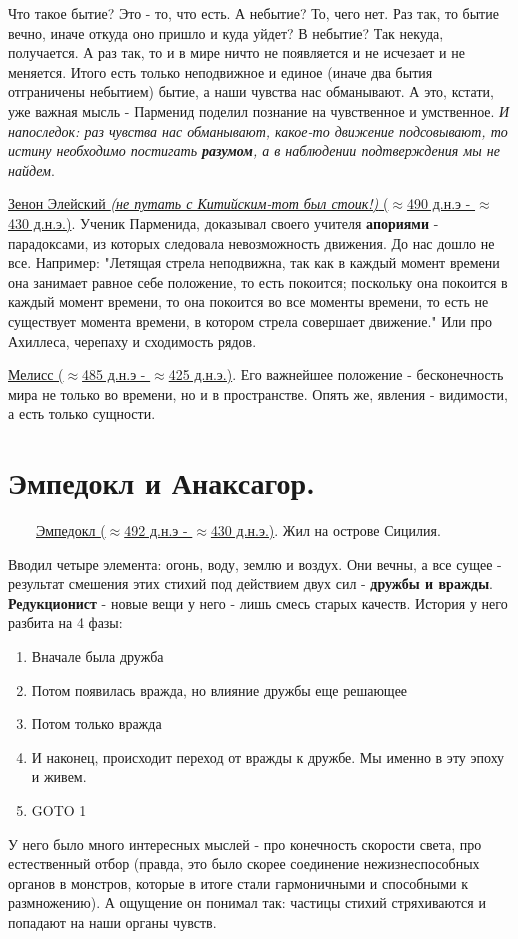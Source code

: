Что такое бытие? Это - то, что есть. А небытие? То, чего нет. Раз так, то бытие вечно, иначе откуда оно пришло и куда уйдет? В небытие? Так некуда, получается. А раз так, то и в мире ничто не появляется и не исчезает и не меняется. Итого есть только неподвижное и единое (иначе два бытия отграничены небытием) бытие, а наши чувства нас обманывают. А это, кстати, уже важная мысль - Парменид поделил познание на чувственное и умственное. \textit{И напоследок: раз чувства нас обманывают, какое-то движение подсовывают, то истину необходимо постигать \textbf{разумом}, а в наблюдении подтверждения мы не найдем}.

\underline{Зенон Элейский \textit{(не путать с Китийским-тот был стоик!)} ($\approx$490 д.н.э - $\approx$430 д.н.э.)}. Ученик Парменида, доказывал своего учителя \textbf{апориями} - парадоксами, из которых следовала невозможность движения. До нас дошло не все. Например: "Летящая стрела неподвижна, так как в каждый момент времени она занимает равное себе положение, то есть покоится; поскольку она покоится в каждый момент времени, то она покоится во все моменты времени, то есть не существует момента времени, в котором стрела совершает движение." Или про Ахиллеса, черепаху и сходимость рядов.

\underline{Мелисс ($\approx$485 д.н.э - $\approx$425 д.н.э.)}. Его важнейшее положение - бесконечность мира не только во времени, но и в пространстве. Опять же, явления - видимости, а есть только сущности.



\section{Эмпедокл и Анаксагор.}
\ \ \ \
\underline{Эмпедокл ($\approx$492 д.н.э - $\approx$430 д.н.э.)}. Жил на острове Сицилия.

Вводил четыре элемента: огонь, воду, землю и воздух. Они вечны, а все сущее - результат смешения этих стихий под действием двух сил - \textbf{дружбы и вражды}. \textbf{Редукционист} - новые вещи у него - лишь смесь старых качеств. История у него разбита на 4 фазы:
\begin{enumerate}
\item Вначале была дружба
\item Потом появилась вражда, но влияние дружбы еще решающее
\item Потом только вражда
\item И наконец, происходит переход от вражды к дружбе. Мы именно в эту эпоху и живем.
\item GOTO 1
\end{enumerate}
У него было много интересных мыслей - про конечность скорости света, про естественный отбор (правда, это было скорее соединение нежизнеспособных органов в монстров, которые в итоге стали гармоничными и способными к размножению). А ощущение он понимал так: частицы стихий стряхиваются и попадают на наши органы чувств.

